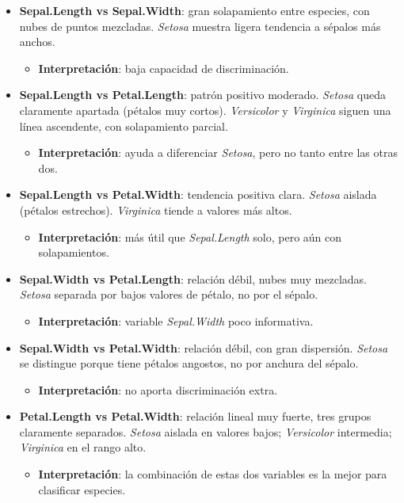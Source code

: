 \documentclass[
  spanish,
  11pt,
  a4paper,
  DIV=11,
  numbers=noendperiod]{scrartcl}
\providecommand{\tightlist}{%
  \setlength{\itemsep}{0pt}\setlength{\parskip}{0pt}}
\begin{document}
\begin{itemize}
\tightlist
\item
  \textbf{Sepal.Length vs Sepal.Width}: gran solapamiento entre
  especies, con nubes de puntos mezcladas. \emph{Setosa} muestra ligera
  tendencia a sépalos más anchos.

  \begin{itemize}
  \tightlist
  \item
    \textbf{Interpretación}: baja capacidad de discriminación.
  \end{itemize}
\item
  \textbf{Sepal.Length vs Petal.Length}: patrón positivo moderado.
  \emph{Setosa} queda claramente apartada (pétalos muy cortos).
  \emph{Versicolor} y \emph{Virginica} siguen una línea ascendente, con
  solapamiento parcial.

  \begin{itemize}
  \tightlist
  \item
    \textbf{Interpretación}: ayuda a diferenciar \emph{Setosa}, pero no
    tanto entre las otras dos.
  \end{itemize}
\item
  \textbf{Sepal.Length vs Petal.Width}: tendencia positiva clara.
  \emph{Setosa} aislada (pétalos estrechos). \emph{Virginica} tiende a
  valores más altos.

  \begin{itemize}
  \tightlist
  \item
    \textbf{Interpretación}: más útil que \emph{Sepal.Length} solo, pero
    aún con solapamientos.
  \end{itemize}
\item
  \textbf{Sepal.Width vs Petal.Length}: relación débil, nubes muy
  mezcladas. \emph{Setosa} separada por bajos valores de pétalo, no por
  el sépalo.

  \begin{itemize}
  \tightlist
  \item
    \textbf{Interpretación}: variable \emph{Sepal.Width} poco
    informativa.
  \end{itemize}
\item
  \textbf{Sepal.Width vs Petal.Width}: relación débil, con gran
  dispersión. \emph{Setosa} se distingue porque tiene pétalos angostos,
  no por anchura del sépalo.

  \begin{itemize}
  \tightlist
  \item
    \textbf{Interpretación}: no aporta discriminación extra.
  \end{itemize}
\item
  \textbf{Petal.Length vs Petal.Width}: relación lineal muy fuerte, tres
  grupos claramente separados. \emph{Setosa} aislada en valores bajos;
  \emph{Versicolor} intermedia; \emph{Virginica} en el rango alto.

  \begin{itemize}
  \tightlist
  \item
    \textbf{Interpretación}: la combinación de estas dos variables es la
    mejor para clasificar especies.
  \end{itemize}
\end{itemize}
\end{document}
